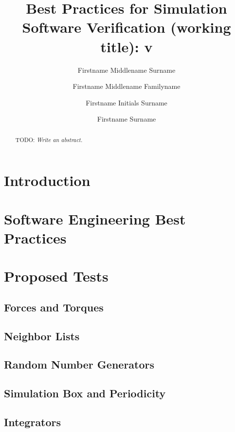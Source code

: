 \documentclass[9pt,bestpractices]{livecoms}
\title{Best Practices for Simulation Software Verification (working
  title): v\versionnumber}
\author[1*]{Firstname Middlename Surname}
\author[1,2\authfn{1}\authfn{3}]{Firstname Middlename Familyname}
\author[2\authfn{1}\authfn{4}]{Firstname Initials Surname}
\author[2*]{Firstname Surname}
\affil[1]{Institution 1}
\affil[2]{Institution 2}
\newcommand{\todo}[1]{{\color{blue}TODO: \emph{#1}}}
\begin{document}
\begin{frontmatter}
\maketitle

\begin{abstract}
  \todo{Write an abstract.}
\end{abstract}

\end{frontmatter}


\section{Introduction}
\label{sec:introduction}



\section{Software Engineering Best Practices}
\label{sec:se-best-practices}



\section{Proposed Tests}
\label{sec:tests}

\subsection{Forces and Torques}
\label{sec:tests.forces-torques}


\subsection{Neighbor Lists}
\label{sec:tests.neighbor-lists}


\subsection{Random Number Generators}
\label{sec:tests.rng}


\subsection{Simulation Box and Periodicity}
\label{sec:tests.box-periodicity}


\subsection{Integrators}
\label{sec:tests.integrators}

\end{document}
